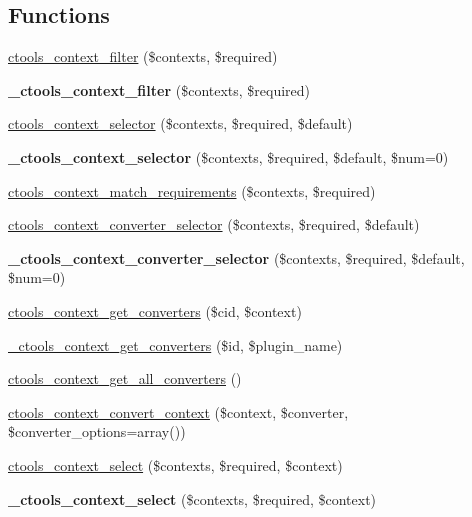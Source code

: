 \subsection*{Functions}
\begin{DoxyCompactItemize}
\item 
\hyperlink{context_8inc_aea84f73021272a5ee58e1e41407375a8}{ctools\_\-context\_\-filter} (\$contexts, \$required)
\item 
\hypertarget{context_8inc_a87c74b19b93ca424742955eb66cd782d}{
{\bfseries \_\-ctools\_\-context\_\-filter} (\$contexts, \$required)}
\label{context_8inc_a87c74b19b93ca424742955eb66cd782d}

\item 
\hyperlink{context_8inc_ae6e443459838081fda4508bb201627bc}{ctools\_\-context\_\-selector} (\$contexts, \$required, \$default)
\item 
\hypertarget{context_8inc_aae57a5b5ad37b6ca84f98089363763d0}{
{\bfseries \_\-ctools\_\-context\_\-selector} (\$contexts, \$required, \$default, \$num=0)}
\label{context_8inc_aae57a5b5ad37b6ca84f98089363763d0}

\item 
\hyperlink{context_8inc_a786d98ab982e644f15a29765bd6e5b8a}{ctools\_\-context\_\-match\_\-requirements} (\$contexts, \$required)
\item 
\hyperlink{context_8inc_a58d73deb6d68d9b36b8221c92df3e5e7}{ctools\_\-context\_\-converter\_\-selector} (\$contexts, \$required, \$default)
\item 
\hypertarget{context_8inc_ae1ad0cde5fe83282caa9ce97b1aa4ba2}{
{\bfseries \_\-ctools\_\-context\_\-converter\_\-selector} (\$contexts, \$required, \$default, \$num=0)}
\label{context_8inc_ae1ad0cde5fe83282caa9ce97b1aa4ba2}

\item 
\hyperlink{context_8inc_a63b14b8dfdba384c89a1a91a8d518009}{ctools\_\-context\_\-get\_\-converters} (\$cid, \$context)
\item 
\hyperlink{context_8inc_a218746c9588a6a7818f4d9513bea95b7}{\_\-ctools\_\-context\_\-get\_\-converters} (\$id, \$plugin\_\-name)
\item 
\hyperlink{context_8inc_a6bc29062f0bdbfd3fb17b41115e52f59}{ctools\_\-context\_\-get\_\-all\_\-converters} ()
\item 
\hyperlink{context_8inc_ae0ec8854edb77367c1fc4d39a20698d6}{ctools\_\-context\_\-convert\_\-context} (\$context, \$converter, \$converter\_\-options=array())
\item 
\hyperlink{context_8inc_ae62023fbc6b102d866ac6ca3c3ee0842}{ctools\_\-context\_\-select} (\$contexts, \$required, \$context)
\item 
\hypertarget{context_8inc_a9140f7ecf09788ea06c2861a027e2a78}{
{\bfseries \_\-ctools\_\-context\_\-select} (\$contexts, \$required, \$context)}
\label{context_8inc_a9140f7ecf09788ea06c2861a027e2a78}


\end{DoxyCompactItemize}
